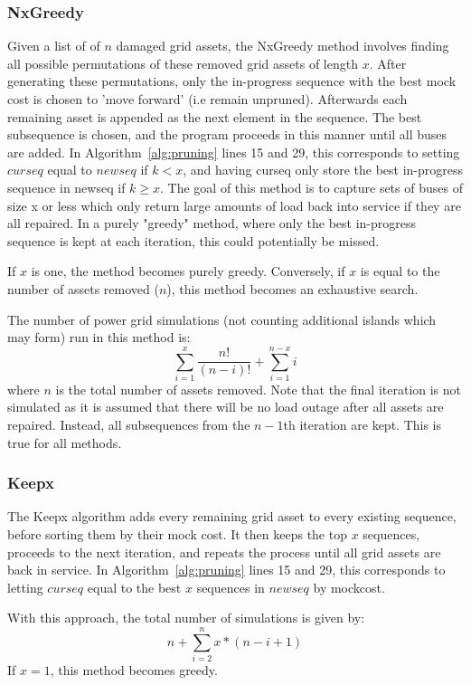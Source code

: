 \documentclass[12pt]{article}
\begin{document}
\subsubsection{NxGreedy}\label{nxgreedy}
Given a list of of $n$ damaged grid assets, the NxGreedy method involves finding all possible permutations of these removed grid assets of length $x$. After generating these permutations, only the in-progress sequence with the best mock cost is chosen to ’move forward’ (i.e remain unpruned). Afterwards each remaining asset is appended as the next element in the sequence. The best subsequence is chosen, and the program proceeds in this manner until all buses are added. In Algorithm~\ref{alg:pruning} lines 15 and 29, this corresponds to setting $curseq$ equal to $newseq$ if $k < x$, and having curseq only store the best in-progress sequence in newseq if $ k \geq x$. The goal of this method is to capture sets of buses of size x or less which only return large amounts of load back into service if they are all repaired. In a purely "greedy" method, where only the best in-progress sequence is kept at each iteration, this could potentially be missed. \par
If $x$ is one, the method becomes purely greedy. Conversely, if $x$ is equal to the number of assets removed ($n$), this method becomes an exhaustive search.\par
The number of power grid simulations (not counting additional islands which may form) run in this method is:
\begin{equation} 
    \sum_{i=1}^{x}\frac{n!}{(n-i)!} + \sum_{i=1}^{n-x}i
    \label{eq:NxGreedysims}
\end{equation}
where $n$ is the total number of assets removed. Note that the final iteration is not simulated as it is assumed that there will be no load outage after all assets are repaired. Instead, all subsequences from the $n-1$th iteration are kept. This is true for all methods.
\subsubsection{Keepx}
The Keepx algorithm adds every remaining grid asset to every existing sequence, before sorting them by their mock cost. It then keeps the top $x$ sequences, proceeds to the next iteration, and repeats the process until all grid assets are back in service. In Algorithm~\ref{alg:pruning} lines 15 and 29, this corresponds to letting $curseq$ equal to the best $x$ sequences in $newseq$ by mockcost. \par
With this approach, the total number of simulations is given by:
\begin{equation} 
    n + \sum_{i=2}^{n}x*(n-i+1)
    \label{eq:Keepxsims}
\end{equation}
If $x = 1$, this method becomes greedy.
\end{document}
